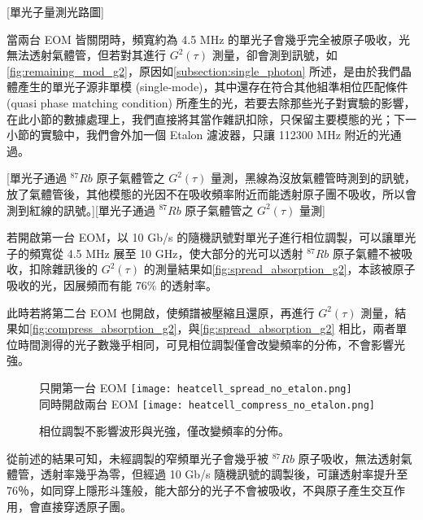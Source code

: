 \documentclass[class=NCU_thesis, crop=false]{standalone}
\begin{document}
[單光子量測光路圖]

當兩台 EOM 皆關閉時，頻寬約為 4.5 MHz 的單光子會幾乎完全被原子吸收，光無法透射氣體管，但若對其進行 $G^{2}(\tau)$ 測量，卻會測到訊號，如\cref{fig:remaining_mod_g2}，原因如\cref{subsection:single_photon} 所述，是由於我們晶體產生的單光子源非單模 (single-mode)，其中還存在符合其他組準相位匹配條件 (quasi phase matching condition) 所產生的光，若要去除那些光子對實驗的影響，在此小節的數據處理上，我們直接將其當作雜訊扣除，只保留主要模態的光；下一小節的實驗中，我們會外加一個 Etalon 濾波器，只讓 112300 MHz 附近的光通過。

[單光子通過 $^{87}Rb$ 原子氣體管之 $G^{2}(\tau)$ 量測，黑線為沒放氣體管時測到的訊號，放了氣體管後，其他模態的光因不在吸收頻率附近而能透射原子團不吸收，所以會測到紅線的訊號。][單光子通過 $^{87}Rb$ 原子氣體管之 $G^{2}(\tau)$ 量測]

若開啟第一台 EOM，以 10 Gb/s 的隨機訊號對單光子進行相位調製，可以讓單光子的頻寬從 4.5 MHz 展至 10 GHz，使大部分的光可以透射 $^{87}Rb$ 原子氣體不被吸收，扣除雜訊後的 $G^2(\tau)$ 的測量結果如\cref{fig:spread_absorption_g2}，本該被原子吸收的光，因展頻而有能 76\% 的透射率。

此時若將第二台 EOM 也開啟，使頻譜被壓縮且還原，再進行 $G^2(\tau)$ 測量，結果如\cref{fig:compress_absorption_g2}，與\cref{fig:spread_absorption_g2} 相比，兩者單位時間測得的光子數幾乎相同，可見相位調製僅會改變頻率的分佈，不會影響光強。


\begin{figure}[!hbt]
    \centering
    \subcaptionbox
        {只開第一台 EOM
        \label{fig:spread_absorption_g2}}
        {\texttt{[image: heatcell\_spread\_no\_etalon.png]}}
    ~~~~
    \subcaptionbox
        {同時開啟兩台 EOM
        \label{fig:compress_absorption_g2}}
        {\texttt{[image: heatcell\_compress\_no\_etalon.png]}}
    \caption{相位調製不影響波形與光強，僅改變頻率的分佈。}
    \label{fig:spread_or_not}
\end{figure}

從前述的結果可知，未經調製的窄頻單光子會幾乎被 $^{87}Rb$ 原子吸收，無法透射氣體管，透射率幾乎為零，但經過 10 Gb/s 隨機訊號的調製後，可讓透射率提升至 76％，如同穿上隱形斗篷般，能大部分的光子不會被吸收，不與原子產生交互作用，會直接穿透原子團。
\end{document}
